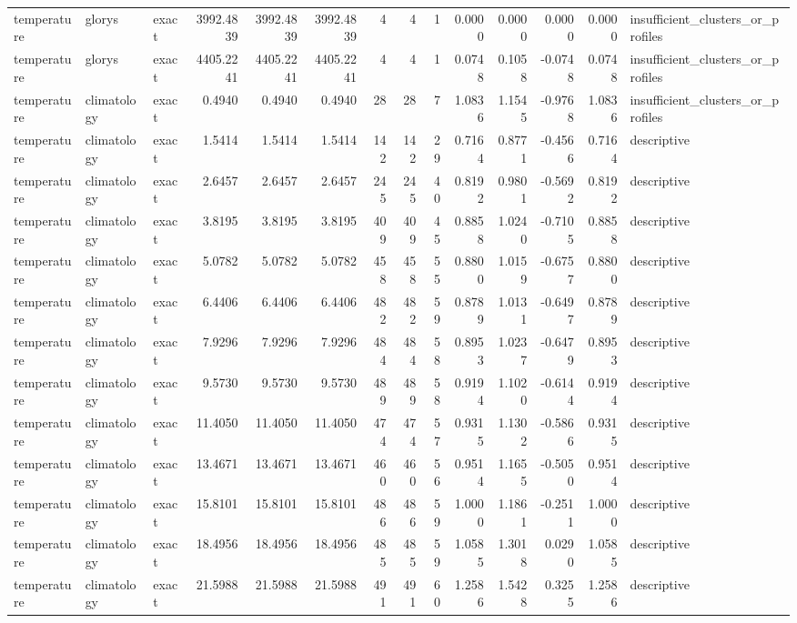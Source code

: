 \begin{tabular}{lllrrrrrrrrrrl}
temperature & glorys & exact & 3992.4839 & 3992.4839 & 3992.4839 & 4 & 4 & 1 & 0.0000 & 0.0000 & 0.0000 & 0.0000 & insufficient_clusters_or_profiles \\
temperature & glorys & exact & 4405.2241 & 4405.2241 & 4405.2241 & 4 & 4 & 1 & 0.0748 & 0.1058 & -0.0748 & 0.0748 & insufficient_clusters_or_profiles \\
temperature & climatology & exact & 0.4940 & 0.4940 & 0.4940 & 28 & 28 & 7 & 1.0836 & 1.1545 & -0.9768 & 1.0836 & insufficient_clusters_or_profiles \\
temperature & climatology & exact & 1.5414 & 1.5414 & 1.5414 & 142 & 142 & 29 & 0.7164 & 0.8771 & -0.4566 & 0.7164 & descriptive \\
temperature & climatology & exact & 2.6457 & 2.6457 & 2.6457 & 245 & 245 & 40 & 0.8192 & 0.9801 & -0.5692 & 0.8192 & descriptive \\
temperature & climatology & exact & 3.8195 & 3.8195 & 3.8195 & 409 & 409 & 45 & 0.8858 & 1.0240 & -0.7105 & 0.8858 & descriptive \\
temperature & climatology & exact & 5.0782 & 5.0782 & 5.0782 & 458 & 458 & 55 & 0.8800 & 1.0159 & -0.6757 & 0.8800 & descriptive \\
temperature & climatology & exact & 6.4406 & 6.4406 & 6.4406 & 482 & 482 & 59 & 0.8789 & 1.0131 & -0.6497 & 0.8789 & descriptive \\
temperature & climatology & exact & 7.9296 & 7.9296 & 7.9296 & 484 & 484 & 58 & 0.8953 & 1.0237 & -0.6479 & 0.8953 & descriptive \\
temperature & climatology & exact & 9.5730 & 9.5730 & 9.5730 & 489 & 489 & 58 & 0.9194 & 1.1020 & -0.6144 & 0.9194 & descriptive \\
temperature & climatology & exact & 11.4050 & 11.4050 & 11.4050 & 474 & 474 & 57 & 0.9315 & 1.1302 & -0.5866 & 0.9315 & descriptive \\
temperature & climatology & exact & 13.4671 & 13.4671 & 13.4671 & 460 & 460 & 56 & 0.9514 & 1.1655 & -0.5050 & 0.9514 & descriptive \\
temperature & climatology & exact & 15.8101 & 15.8101 & 15.8101 & 486 & 486 & 59 & 1.0000 & 1.1861 & -0.2511 & 1.0000 & descriptive \\
temperature & climatology & exact & 18.4956 & 18.4956 & 18.4956 & 485 & 485 & 59 & 1.0585 & 1.3018 & 0.0290 & 1.0585 & descriptive \\
temperature & climatology & exact & 21.5988 & 21.5988 & 21.5988 & 491 & 491 & 60 & 1.2586 & 1.5428 & 0.3255 & 1.2586 & descriptive \\

\end{tabular}

